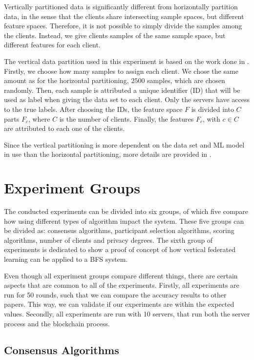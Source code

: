 Vertically partitioned data is significantly different from horizontally partition data, in the sense that the clients share intersecting sample spaces, but different feature spaces. Therefore, it is not possible to simply divide the samples among the clients. Instead, we give clients samples of the same sample space, but different features for each client.

The vertical data partition used in this experiment is based on the work done in \cite{10.48550/arxiv.2104.00489}. Firstly, we choose how many samples to assign each client. We chose the same amount as for the horizontal partitioning, $2500$ samples, which are chosen randomly. Then, each sample is attributed a unique identifier (ID) that will be used as label when giving the data set to each client. Only the servers have access to the true labels. After choosing the IDs, the feature space $F$ is divided into $C$ parts $F_c$, where $C$ is the number of clients. Finally, the features $F_c$, with $c \in C$ are attributed to each one of the clients.

Since the vertical partitioning is more dependent on the data set and ML model in use than the horizontal partitioning, more details are provided in .

\section{Experiment Groups}\label{meth:experiments}

The conducted experiments can be divided into six groups, of which five compare how using different types of algorithm impact the system. These five groups can be divided as: consensus algorithms, participant selection algorithms, scoring algorithms, number of clients and privacy degrees. The sixth group of experiments is dedicated to show a proof of concept of how vertical federated learning can be applied to a BFS system.

Even though all experiment groups compare different things, there are certain aspects that are common to all of the experiments. Firstly, all experiments are run for 50 rounds, such that we can compare the accuracy results to other papers. This way, we can validate if our experiments are within the expected values. Secondly, all experiments are run with 10 servers, that run both the server process and the blockchain process. 

\subsection{Consensus Algorithms}

